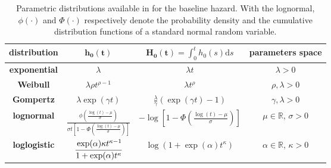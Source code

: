 \begin{table}[] \centering 
\renewcommand{\arraystretch}{1.5}
  \begin{tabular}{cccc}
  \hline \hline
  {\bf distribution}                 & $\bm{h_{0}(t)}$                                            & $\bm{H_{0}(t)} = \int_{0}^{t} h_{0} ( s ) \textrm{d} s$           & {\bf parameters space} \\  
  \hline
  {\bf exponential}                  & $\lambda$                                                  & $\lambda t$                                                       & $\lambda > 0$ \\
  {\bf Weibull}                      & $\lambda \rho t^{\rho - 1}$                                & $\lambda t^{\rho}$                                                & $\rho, \lambda > 0$   \\
  {\bf Gompertz}                     & $\lambda \exp ( \gamma t )$                                & $\frac{\lambda}{\gamma} \left(\exp (\gamma t) - 1\right)$         & $\gamma, \lambda > 0$ \\
  \multirow{2}{*}{{\bf lognormal}}   & \multirow{2}{*}{$\frac{\phi \left(\tfrac{\log(t) - \mu}{\sigma} \right)}
	      		   {\sigma t \left[1 - \Phi\left(\tfrac{\log(t) - \mu}{\sigma} \right) \right]}$} & \multirow{2}{*}{$- \log \left[1 - \Phi\left(\tfrac{\log(t) - \mu}
					                                                                                   {\sigma} \right)\right]$}                                      & \multirow{2}{*}{$\mu \in                       \mathbb{R}$, $\sigma > 0$}\\
					                 &                                                            &                                                                   &                         \\     
  \multirow{2}{*}{{\bf loglogistic}}& \multirow{2}{*}{$\cfrac{\exp(\alpha) \kappa t^{\kappa - 1}}
	                                               {1 + \exp(\alpha) t^{\kappa}}$}                & \multirow{2}{*}{$\log \left(1 + \exp(\alpha) t^{\kappa}\right)$} & \multirow{2}{*}{$\alpha \in \mathbb{R}$, $\kappa > 0$} \\
	                                 &                                                            &                                                                   &                          \\                
	\hline \hline
	\end{tabular}
\caption{Parametric distributions available in  for the baseline hazard. With the lognormal, $\phi(\cdot)$ and $\Phi(\cdot)$ respectively denote the probability density and the cumulative distribution functions of a standard normal random variable.}
\label{tab:model.baselines}	
\end{table} 

% 